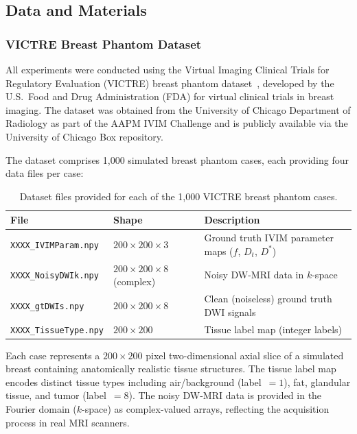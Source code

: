 \documentclass[12pt]{article}
\begin{document}
\subsection{Data and Materials}

\subsubsection{VICTRE Breast Phantom Dataset}

All experiments were conducted using the Virtual Imaging Clinical Trials for Regulatory Evaluation (VICTRE) breast phantom dataset~\cite{badano2018}, developed by the U.S.\ Food and Drug Administration (FDA) for virtual clinical trials in breast imaging. The dataset was obtained from the University of Chicago Department of Radiology as part of the AAPM IVIM Challenge and is publicly available via the University of Chicago Box repository.

The dataset comprises 1,000 simulated breast phantom cases, each providing four data files per case:

\begin{table}[h]
\centering
\caption{Dataset files provided for each of the 1,000 VICTRE breast phantom cases.}
\label{tab:dataset_files}
\begin{tabular}{lll}
\toprule
\textbf{File} & \textbf{Shape} & \textbf{Description} \\
\midrule
\texttt{XXXX\_IVIMParam.npy}  & $200\times200\times3$           & Ground truth IVIM parameter maps ($f$, $D_t$, $D^*$) \\
\texttt{XXXX\_NoisyDWIk.npy}  & $200\times200\times8$ (complex) & Noisy DW-MRI data in $k$-space \\
\texttt{XXXX\_gtDWIs.npy}     & $200\times200\times8$           & Clean (noiseless) ground truth DWI signals \\
\texttt{XXXX\_TissueType.npy} & $200\times200$                  & Tissue label map (integer labels) \\
\bottomrule
\end{tabular}
\end{table}

Each case represents a $200\times200$ pixel two-dimensional axial slice of a simulated breast containing anatomically realistic tissue structures. The tissue label map encodes distinct tissue types including air/background (label~$=1$), fat, glandular tissue, and tumor (label~$=8$). The noisy DW-MRI data is provided in the Fourier domain ($k$-space) as complex-valued arrays, reflecting the acquisition process in real MRI scanners.
\end{document}
